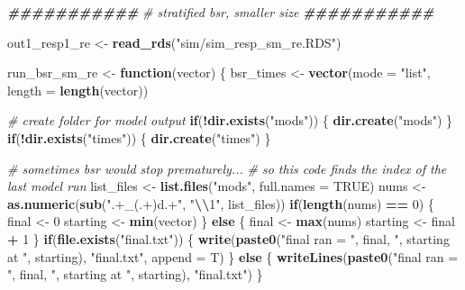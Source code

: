 \documentclass[12pt, twoside]{amherstthesis}
\newenvironment{Shaded}{\begin{snugshade}}{\end{snugshade}}
\newcommand{\AttributeTok}[1]{\textcolor[rgb]{0.13,0.29,0.53}{#1}}
\newcommand{\CommentTok}[1]{\textcolor[rgb]{0.56,0.35,0.01}{\textit{#1}}}
\newcommand{\ConstantTok}[1]{\textcolor[rgb]{0.56,0.35,0.01}{#1}}
\newcommand{\ControlFlowTok}[1]{\textcolor[rgb]{0.13,0.29,0.53}{\textbf{#1}}}
\newcommand{\DecValTok}[1]{\textcolor[rgb]{0.00,0.00,0.81}{#1}}
\newcommand{\DocumentationTok}[1]{\textcolor[rgb]{0.56,0.35,0.01}{\textbf{\textit{#1}}}}
\newcommand{\FunctionTok}[1]{\textcolor[rgb]{0.13,0.29,0.53}{\textbf{#1}}}
\newcommand{\NormalTok}[1]{#1}
\newcommand{\OtherTok}[1]{\textcolor[rgb]{0.56,0.35,0.01}{#1}}
\newcommand{\SpecialCharTok}[1]{\textcolor[rgb]{0.81,0.36,0.00}{\textbf{#1}}}
\newcommand{\StringTok}[1]{\textcolor[rgb]{0.31,0.60,0.02}{#1}}
\begin{document}
\scriptsize
\begin{Shaded}
\begin{Highlighting}[]
\DocumentationTok{\#\#\#\#\#\#\#\#\#\#\#}
\CommentTok{\# stratified bsr, smaller size}
\DocumentationTok{\#\#\#\#\#\#\#\#\#\#\#}

\NormalTok{out1\_resp1\_re }\OtherTok{\textless{}{-}} \FunctionTok{read\_rds}\NormalTok{(}\StringTok{"sim/sim\_resp\_sm\_re.RDS"}\NormalTok{)}

\NormalTok{run\_bsr\_sm\_re }\OtherTok{\textless{}{-}} \ControlFlowTok{function}\NormalTok{(vector) \{}
\NormalTok{  bsr\_times }\OtherTok{\textless{}{-}} \FunctionTok{vector}\NormalTok{(}\AttributeTok{mode =} \StringTok{"list"}\NormalTok{, }\AttributeTok{length =} \FunctionTok{length}\NormalTok{(vector))}
  
  \CommentTok{\# create folder for model output}
  \ControlFlowTok{if}\NormalTok{(}\SpecialCharTok{!}\FunctionTok{dir.exists}\NormalTok{(}\StringTok{"mods"}\NormalTok{)) \{}
    \FunctionTok{dir.create}\NormalTok{(}\StringTok{"mods"}\NormalTok{)}
\NormalTok{  \}}
  \ControlFlowTok{if}\NormalTok{(}\SpecialCharTok{!}\FunctionTok{dir.exists}\NormalTok{(}\StringTok{"times"}\NormalTok{)) \{}
    \FunctionTok{dir.create}\NormalTok{(}\StringTok{"times"}\NormalTok{)}
\NormalTok{  \}}
  
  \CommentTok{\# sometimes bsr would stop prematurely...}
  \CommentTok{\# so this code finds the index of the last model run}
\NormalTok{  list\_files }\OtherTok{\textless{}{-}} \FunctionTok{list.files}\NormalTok{(}\StringTok{"mods"}\NormalTok{, }\AttributeTok{full.names =} \ConstantTok{TRUE}\NormalTok{)}
\NormalTok{  nums }\OtherTok{\textless{}{-}} \FunctionTok{as.numeric}\NormalTok{(}\FunctionTok{sub}\NormalTok{(}\StringTok{".+\_(.+)d.+"}\NormalTok{, }\StringTok{"}\SpecialCharTok{\textbackslash{}\textbackslash{}}\StringTok{1"}\NormalTok{, list\_files))}
  \ControlFlowTok{if}\NormalTok{(}\FunctionTok{length}\NormalTok{(nums) }\SpecialCharTok{==} \DecValTok{0}\NormalTok{) \{}
\NormalTok{    final }\OtherTok{\textless{}{-}} \DecValTok{0}
\NormalTok{    starting }\OtherTok{\textless{}{-}} \FunctionTok{min}\NormalTok{(vector)}
\NormalTok{  \} }\ControlFlowTok{else}\NormalTok{ \{}
\NormalTok{    final }\OtherTok{\textless{}{-}} \FunctionTok{max}\NormalTok{(nums)}
\NormalTok{    starting }\OtherTok{\textless{}{-}}\NormalTok{ final }\SpecialCharTok{+} \DecValTok{1}
\NormalTok{  \}}
  \ControlFlowTok{if}\NormalTok{(}\FunctionTok{file.exists}\NormalTok{(}\StringTok{"final.txt"}\NormalTok{)) \{}
    \FunctionTok{write}\NormalTok{(}\FunctionTok{paste0}\NormalTok{(}\StringTok{"final ran = "}\NormalTok{, final, }\StringTok{", starting at "}\NormalTok{, starting), }\StringTok{"final.txt"}\NormalTok{, }\AttributeTok{append =}\NormalTok{ T)}
\NormalTok{  \} }\ControlFlowTok{else}\NormalTok{ \{}
    \FunctionTok{writeLines}\NormalTok{(}\FunctionTok{paste0}\NormalTok{(}\StringTok{"final ran = "}\NormalTok{, final, }\StringTok{", starting at "}\NormalTok{, starting), }\StringTok{"final.txt"}\NormalTok{)}
\NormalTok{  \}}
  

\end{Highlighting}
\end{Shaded}
\end{document}
